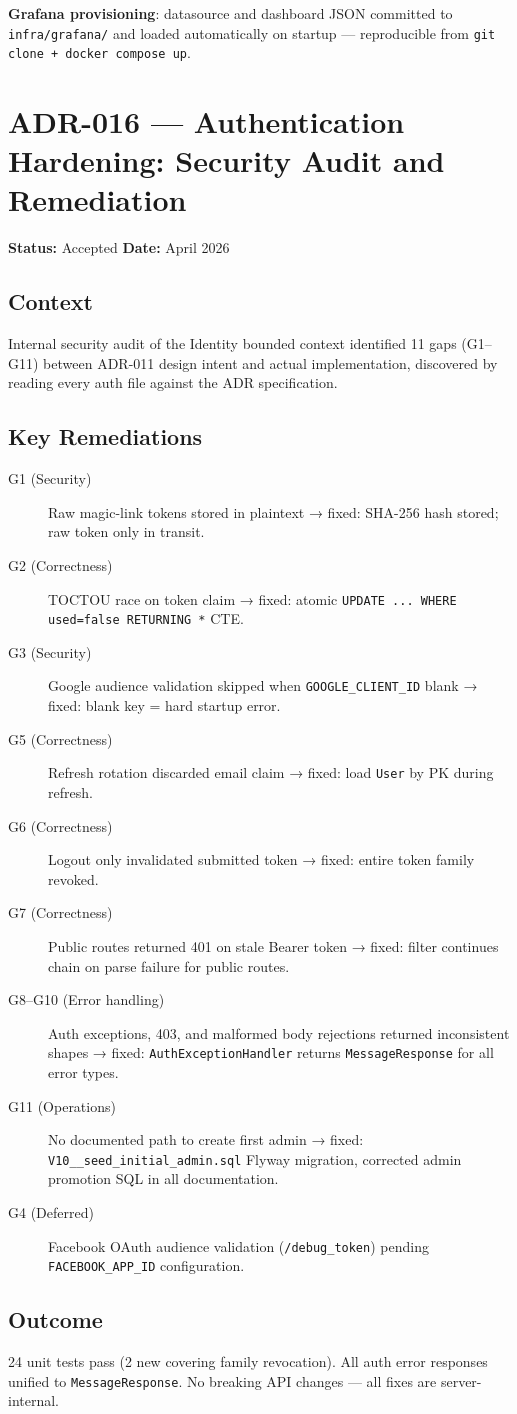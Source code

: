 \textbf{Grafana provisioning}: datasource and dashboard JSON committed to \texttt{infra/grafana/} and loaded automatically on startup — reproducible from \texttt{git clone + docker compose up}.

\section{ADR-016 — Authentication Hardening: Security Audit and Remediation}
\label{adr:016}
\textbf{Status:} Accepted \quad \textbf{Date:} April 2026

\subsection*{Context}
Internal security audit of the Identity bounded context identified 11 gaps (G1–G11) between ADR-011 design intent and actual implementation, discovered by reading every auth file against the ADR specification.

\subsection*{Key Remediations}
\begin{description}
    \item[G1 (Security)] Raw magic-link tokens stored in plaintext → fixed: SHA-256 hash stored; raw token only in transit.
    \item[G2 (Correctness)] TOCTOU race on token claim → fixed: atomic \texttt{UPDATE ... WHERE used=false RETURNING *} CTE.
    \item[G3 (Security)] Google audience validation skipped when \texttt{GOOGLE\_CLIENT\_ID} blank → fixed: blank key = hard startup error.
    \item[G5 (Correctness)] Refresh rotation discarded email claim → fixed: load \texttt{User} by PK during refresh.
    \item[G6 (Correctness)] Logout only invalidated submitted token → fixed: entire token family revoked.
    \item[G7 (Correctness)] Public routes returned 401 on stale Bearer token → fixed: filter continues chain on parse failure for public routes.
    \item[G8–G10 (Error handling)] Auth exceptions, 403, and malformed body rejections returned inconsistent shapes → fixed: \texttt{AuthExceptionHandler} returns \texttt{MessageResponse} for all error types.
    \item[G11 (Operations)] No documented path to create first admin → fixed: \texttt{V10\_\_seed\_initial\_admin.sql} Flyway migration, corrected admin promotion SQL in all documentation.
    \item[G4 (Deferred)] Facebook OAuth audience validation (\texttt{/debug\_token}) pending \texttt{FACEBOOK\_APP\_ID} configuration.
\end{description}

\subsection*{Outcome}
24 unit tests pass (2 new covering family revocation). All auth error responses unified to \texttt{MessageResponse}. No breaking API changes — all fixes are server-internal.
